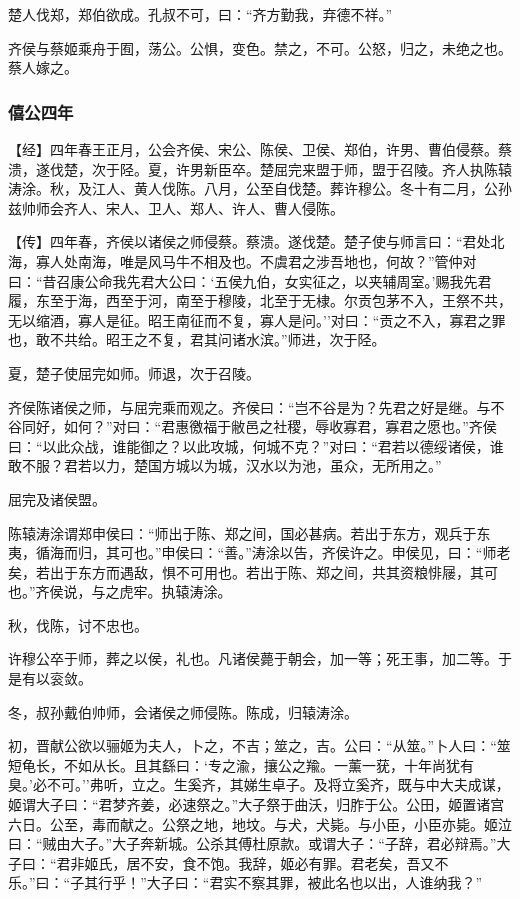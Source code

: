 \documentclass[]{article}
\begin{document}
楚人伐郑，郑伯欲成。孔叔不可，曰：``齐方勤我，弃德不祥。''

齐侯与蔡姬乘舟于囿，荡公。公惧，变色。禁之，不可。公怒，归之，未绝之也。蔡人嫁之。

\hypertarget{header-n678}{%
\subsubsection{僖公四年}\label{header-n678}}

【经】四年春王正月，公会齐侯、宋公、陈侯、卫侯、郑伯，许男、曹伯侵蔡。蔡溃，遂伐楚，次于陉。夏，许男新臣卒。楚屈完来盟于师，盟于召陵。齐人执陈辕涛涂。秋，及江人、黄人伐陈。八月，公至自伐楚。葬许穆公。冬十有二月，公孙兹帅师会齐人、宋人、卫人、郑人、许人、曹人侵陈。

【传】四年春，齐侯以诸侯之师侵蔡。蔡溃。遂伐楚。楚子使与师言曰：``君处北海，寡人处南海，唯是风马牛不相及也。不虞君之涉吾地也，何故？''管仲对曰：``昔召康公命我先君大公曰：`五侯九伯，女实征之，以夹辅周室。'赐我先君履，东至于海，西至于河，南至于穆陵，北至于无棣。尔贡包茅不入，王祭不共，无以缩酒，寡人是征。昭王南征而不复，寡人是问。''对曰：``贡之不入，寡君之罪也，敢不共给。昭王之不复，君其问诸水滨。''师进，次于陉。

夏，楚子使屈完如师。师退，次于召陵。

齐侯陈诸侯之师，与屈完乘而观之。齐侯曰：``岂不谷是为？先君之好是继。与不谷同好，如何？''对曰：``君惠徼福于敝邑之社稷，辱收寡君，寡君之愿也。''齐侯曰：``以此众战，谁能御之？以此攻城，何城不克？''对曰：``君若以德绥诸侯，谁敢不服？君若以力，楚国方城以为城，汉水以为池，虽众，无所用之。''

屈完及诸侯盟。

陈辕涛涂谓郑申侯曰：``师出于陈、郑之间，国必甚病。若出于东方，观兵于东夷，循海而归，其可也。''申侯曰：``善。''涛涂以告，齐侯许之。申侯见，曰：``师老矣，若出于东方而遇敌，惧不可用也。若出于陈、郑之间，共其资粮悱屦，其可也。''齐侯说，与之虎牢。执辕涛涂。

秋，伐陈，讨不忠也。

许穆公卒于师，葬之以侯，礼也。凡诸侯薨于朝会，加一等；死王事，加二等。于是有以衮敛。

冬，叔孙戴伯帅师，会诸侯之师侵陈。陈成，归辕涛涂。

初，晋献公欲以骊姬为夫人，卜之，不吉；筮之，吉。公曰：``从筮。''卜人曰：``筮短龟长，不如从长。且其繇曰：`专之渝，攘公之羭。一薰一莸，十年尚犹有臭。'必不可。''弗听，立之。生奚齐，其娣生卓子。及将立奚齐，既与中大夫成谋，姬谓大子曰：``君梦齐姜，必速祭之。''大子祭于曲沃，归胙于公。公田，姬置诸宫六日。公至，毒而献之。公祭之地，地坟。与犬，犬毙。与小臣，小臣亦毙。姬泣曰：``贼由大子。''大子奔新城。公杀其傅杜原款。或谓大子：``子辞，君必辩焉。''大子曰：``君非姬氏，居不安，食不饱。我辞，姬必有罪。君老矣，吾又不乐。''曰：``子其行乎！''大子曰：``君实不察其罪，被此名也以出，人谁纳我？''
\end{document}
